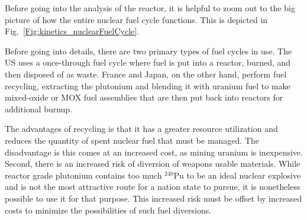 Before going into the analysis of the reactor, it is helpful to zoom out to the big picture of how the entire nuclear fuel cycle functions. This is depicted in Fig.~\ref{Fig:kinetics_nuclearFuelCycle}.

Before going into details, there are two primary types of fuel cycles in use. The US uses a once-through fuel cycle where fuel is put into a reactor, burned, and then disposed of as waste. France and Japan, on the other hand, perform fuel recycling, extracting the plutonium and blending it with uranium fuel to make mixed-oxide or MOX fuel assemblies that are then put back into reactors for additional burnup. 

The advantages of recycling is that it has a greater resource utilization and reduces the quantity of spent nuclear fuel that must be managed. The disadvantage is this comes at an increased cost, as mining uranium is inexpensive. Second, there is an increased risk of diversion of weapons usable materials. While reactor grade plutonium contains too much $^{240}$Pu to be an ideal nuclear explosive and is not the most attractive route for a nation state to pursue, it is nonetheless possible to use it for that purpose. This increased risk must be offset by increased costs to minimize the possibilities of such fuel diversions.

